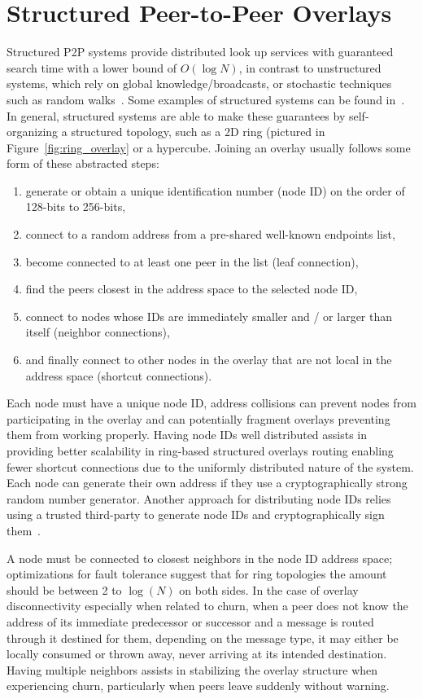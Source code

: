 \chapter{Structured Peer-to-Peer Overlays}
\label{structured_p2p}
Structured P2P systems provide distributed look up services with guaranteed
search time with a lower bound of $O(\log N)$, in contrast to unstructured
systems, which rely on global knowledge/broadcasts, or stochastic techniques
such as random walks~\cite{unstructured_v_structured}.  Some examples of
structured systems can be found in~\cite{pastry, chord, symphony, kademlia,
can, brunet}.  In general, structured systems are able to make these guarantees
by self-organizing a structured topology, such as a 2D ring (pictured in
Figure~\ref{fig:ring_overlay} or a hypercube.  Joining an overlay usually
follows some form of these abstracted steps:
\begin{enumerate}
\item generate or obtain a unique identification number (node ID) on the
order of 128-bits to 256-bits,
\item connect to a random address from a pre-shared well-known endpoints list,
\item become connected to at least one peer in the list (leaf connection),
\item find the peers closest in the address space to the selected node ID,
\item connect to nodes whose IDs are immediately smaller and / or larger than
itself (neighbor connections),
\item and finally connect to other nodes in the overlay that are not local in
the address space (shortcut connections).
\end{enumerate}

Each node must have a unique node ID, address collisions can prevent nodes from
participating in the overlay and can potentially fragment overlays preventing
them from working properly.  Having node IDs well distributed assists in
providing better scalability in ring-based structured overlays routing enabling
fewer shortcut connections due to the uniformly distributed nature of the system.
Each node can generate their own address if they use a cryptographically strong
random number generator.  Another approach for distributing node IDs relies
using a trusted third-party to generate node IDs and cryptographically sign
them~\cite{secure_routing}.

A node must be connected to closest neighbors in the node ID address space;
optimizations for fault tolerance suggest that for ring topologies the amount
should be between 2 to $\log(N)$ on both sides.  In the case of overlay
disconnectivity especially when related to churn, when a peer does not know the
address of its immediate predecessor or successor and a message is routed
through it destined for them, depending on the message type, it may either be
locally consumed or thrown away, never arriving at its intended destination.
Having multiple neighbors assists in stabilizing the overlay structure when
experiencing churn, particularly when peers leave suddenly without warning.


